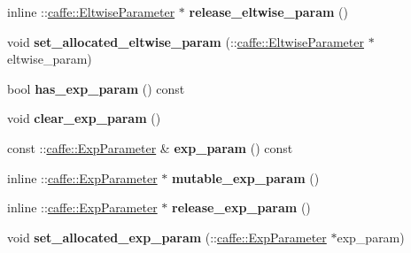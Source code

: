 \begin{DoxyCompactItemize}
inline \+::\mbox{\hyperlink{classcaffe_1_1_eltwise_parameter}{caffe\+::\+Eltwise\+Parameter}} $\ast$ {\bfseries release\+\_\+eltwise\+\_\+param} ()
\item 
\mbox{\label{classcaffe_1_1_v1_layer_parameter_a75cb4b3841509347f124a15b7c4ed34a}} 
void {\bfseries set\+\_\+allocated\+\_\+eltwise\+\_\+param} (\+::\mbox{\hyperlink{classcaffe_1_1_eltwise_parameter}{caffe\+::\+Eltwise\+Parameter}} $\ast$eltwise\+\_\+param)
\item 
\mbox{\label{classcaffe_1_1_v1_layer_parameter_a578cecc6ab3c9c779b070fd3b4bd4d47}} 
bool {\bfseries has\+\_\+exp\+\_\+param} () const
\item 
\mbox{\label{classcaffe_1_1_v1_layer_parameter_a50e536df42170253b5101efae046b4ea}} 
void {\bfseries clear\+\_\+exp\+\_\+param} ()
\item 
\mbox{\label{classcaffe_1_1_v1_layer_parameter_a44c051a6cfa65cdf264b9803fb80729d}} 
const \+::\mbox{\hyperlink{classcaffe_1_1_exp_parameter}{caffe\+::\+Exp\+Parameter}} \& {\bfseries exp\+\_\+param} () const
\item 
\mbox{\label{classcaffe_1_1_v1_layer_parameter_a5ea4539da317493b23298965ad4772d5}} 
inline \+::\mbox{\hyperlink{classcaffe_1_1_exp_parameter}{caffe\+::\+Exp\+Parameter}} $\ast$ {\bfseries mutable\+\_\+exp\+\_\+param} ()
\item 
\mbox{\label{classcaffe_1_1_v1_layer_parameter_a794954da8992c222bc49355aadf3a6c0}} 
inline \+::\mbox{\hyperlink{classcaffe_1_1_exp_parameter}{caffe\+::\+Exp\+Parameter}} $\ast$ {\bfseries release\+\_\+exp\+\_\+param} ()
\item 
\mbox{\label{classcaffe_1_1_v1_layer_parameter_a3ad5cc072e37a3c1e684590c9c67552a}} 
void {\bfseries set\+\_\+allocated\+\_\+exp\+\_\+param} (\+::\mbox{\hyperlink{classcaffe_1_1_exp_parameter}{caffe\+::\+Exp\+Parameter}} $\ast$exp\+\_\+param)
\item 
\mbox{\label{classcaffe_1_1_v1_layer_parameter_acf35946808d2930852d1a7b84c7a8b66}} 

\end{DoxyCompactItemize}
